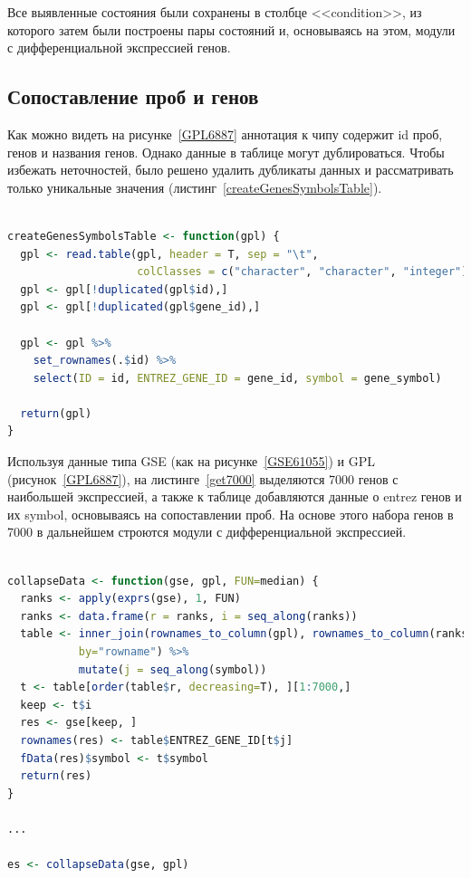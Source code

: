 \documentclass[times,specification,annotation]{itmo-student-thesis}
\begin{document}
Все выявленные состояния были сохранены в столбце <<condition>>, из которого затем были построены пары состояний и, основываясь на этом, модули с дифференциальной экспрессией генов.

\subsection{Сопоставление проб и генов}

Как можно видеть на рисунке~\ref{GPL6887} аннотация к чипу содержит id проб, генов и названия генов. Однако данные в таблице могут дублироваться. Чтобы избежать неточностей, было решено удалить дубликаты данных и рассматривать только уникальные значения (листинг~\ref{createGenesSymbolsTable}).

\begin{lstlisting}[float=!h, caption={Выделение условий.}, captionpos=b, label={createGenesSymbolsTable}, basicstyle=\footnotesize, language=R]

createGenesSymbolsTable <- function(gpl) {
  gpl <- read.table(gpl, header = T, sep = "\t",
                    colClasses = c("character", "character", "integer"))
  gpl <- gpl[!duplicated(gpl$id),]
  gpl <- gpl[!duplicated(gpl$gene_id),]
  
  gpl <- gpl %>% 
    set_rownames(.$id) %>% 
    select(ID = id, ENTREZ_GENE_ID = gene_id, symbol = gene_symbol)

  return(gpl)
}

\end{lstlisting}

Используя данные типа GSE (как на рисунке~\ref{GSE61055}) и GPL (рисунок~\ref{GPL6887}), на листинге~\ref{get7000} выделяются 7000 генов с наибольшей экспрессией, а также к таблице добавляются данные о entrez генов и их symbol, основываясь на сопоставлении проб. На основе этого набора генов в 7000 в дальнейшем строются модули с дифференциальной экспрессией. 

\begin{lstlisting}[float=!h, caption={Выделение 7000 генов с максимальной экспрессией.}, captionpos=b, label={get7000}, basicstyle=\footnotesize, language=R]

collapseData <- function(gse, gpl, FUN=median) {
  ranks <- apply(exprs(gse), 1, FUN)
  ranks <- data.frame(r = ranks, i = seq_along(ranks))
  table <- inner_join(rownames_to_column(gpl), rownames_to_column(ranks), 
           by="rowname") %>% 
           mutate(j = seq_along(symbol))
  t <- table[order(table$r, decreasing=T), ][1:7000,]
  keep <- t$i
  res <- gse[keep, ]
  rownames(res) <- table$ENTREZ_GENE_ID[t$j]
  fData(res)$symbol <- t$symbol
  return(res)
}

...

es <- collapseData(gse, gpl)

\end{lstlisting}    
\end{document}
